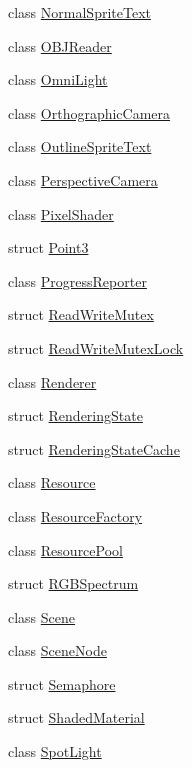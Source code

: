 \begin{DoxyCompactItemize}
\item 
class \hyperlink{classmage_1_1_normal_sprite_text}{Normal\+Sprite\+Text}
\item 
class \hyperlink{classmage_1_1_o_b_j_reader}{O\+B\+J\+Reader}
\item 
class \hyperlink{classmage_1_1_omni_light}{Omni\+Light}
\item 
class \hyperlink{classmage_1_1_orthographic_camera}{Orthographic\+Camera}
\item 
class \hyperlink{classmage_1_1_outline_sprite_text}{Outline\+Sprite\+Text}
\item 
class \hyperlink{classmage_1_1_perspective_camera}{Perspective\+Camera}
\item 
class \hyperlink{classmage_1_1_pixel_shader}{Pixel\+Shader}
\item 
struct \hyperlink{structmage_1_1_point3}{Point3}
\item 
class \hyperlink{classmage_1_1_progress_reporter}{Progress\+Reporter}
\item 
struct \hyperlink{structmage_1_1_read_write_mutex}{Read\+Write\+Mutex}
\item 
struct \hyperlink{structmage_1_1_read_write_mutex_lock}{Read\+Write\+Mutex\+Lock}
\item 
class \hyperlink{classmage_1_1_renderer}{Renderer}
\item 
struct \hyperlink{structmage_1_1_rendering_state}{Rendering\+State}
\item 
struct \hyperlink{structmage_1_1_rendering_state_cache}{Rendering\+State\+Cache}
\item 
class \hyperlink{classmage_1_1_resource}{Resource}
\item 
class \hyperlink{classmage_1_1_resource_factory}{Resource\+Factory}
\item 
class \hyperlink{classmage_1_1_resource_pool}{Resource\+Pool}
\item 
struct \hyperlink{structmage_1_1_r_g_b_spectrum}{R\+G\+B\+Spectrum}
\item 
class \hyperlink{classmage_1_1_scene}{Scene}
\item 
class \hyperlink{classmage_1_1_scene_node}{Scene\+Node}
\item 
struct \hyperlink{structmage_1_1_semaphore}{Semaphore}
\item 
struct \hyperlink{structmage_1_1_shaded_material}{Shaded\+Material}
\item 
class \hyperlink{classmage_1_1_spot_light}{Spot\+Light}
\item 

\end{DoxyCompactItemize}
